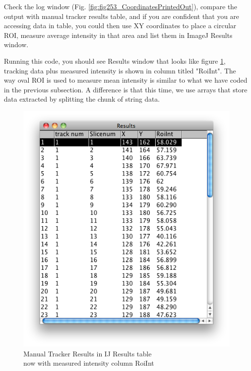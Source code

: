 \documentclass[11pt,a4paper,oneside]{report}
\begin{document}
Check the log window (Fig. \ref{fig:fig253_CoordinatesPrintedOut}), compare the output with manual tracker results table, and if you are confident that you are accessing data in table, you could then use XY coordinates to place a circular ROI, measure average intensity in that area and list them in ImageJ Results window.



Running this code, you should see Results window that looks like figure \ref{fig:fig262_ManualTrackIntfinalResults}, tracking data plus measured intensity is shown in column titled "RoiInt". The way oval ROI is used to measure mean intensity is similar to what we have coded in the previous subsection. A difference is that this time, we use arrays that store data extracted by splitting the chunk of string data. 

\begin{figure}[htbp]
\begin{center}
\includegraphics[scale=0.5]{fig/fig262_ManualTrackIntensityFinalResults.png}
\caption{ Manual Tracker Results in IJ Results table\\ now with measured intensity column RoiInt}
\label{fig:fig262_ManualTrackIntfinalResults}
\end{center}
\end{figure}
\end{document}
